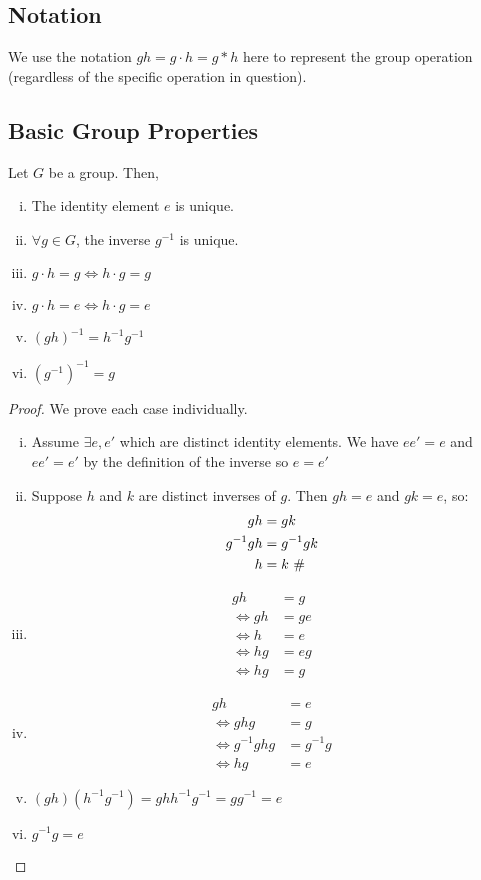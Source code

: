 \subsection{Notation}
We use the notation \(gh=g\cdot h = g \ast h\) here to represent the group operation (regardless of the specific operation in question).
\subsection{Basic Group Properties}
\begin{proposition}
	Let \(G\) be a group.
	Then,
	\begin{enumerate}[i.]
		\item The identity element \(e\) is unique.
		\item \(\forall g \in G\), the inverse \(g^{-1}\) is unique.
		\item \(g \cdot h = g \iff h \cdot g = g\)
		\item \(g \cdot h = e \iff h \cdot g = e\)
		\item \((gh)^{-1} = h^{-1} g^{-1}\)
		\item \((g^{-1})^{-1} = g\)
	\end{enumerate}
\end{proposition}
\begin{proof}
	We prove each case individually.
	\begin{enumerate}[i.]
		\item Assume \(\exists e, e'\) which are distinct identity elements.
		      We have \(e e' = e\) and \(e e' = e'\) by the definition of the inverse so \(e = e'\) \contradiction{}
		\item Suppose \(h\) and \(k\) are distinct inverses of \(g\).
		      Then \(gh = e\) and \(gk = e\), so:
		      \begin{align*}
			      gh        & = gk                       \\
			      g^{-1} gh & = g^{-1} gk                \\
			      h         & = k \text{ \(\#\)}
		      \end{align*}
		\item \begin{align*}
			      gh      & = g  \\
			      \iff gh & = ge \\
			      \iff h  & = e  \\
			      \iff hg & = eg \\
			      \iff hg & = g
		      \end{align*}
		\item \begin{align*}
			      gh              & = e       \\
			      \iff ghg        & = g       \\
			      \iff g^{-1} ghg & = g^{-1}g \\
			      \iff hg         & = e
		      \end{align*}
		\item \((gh) (h^{-1}g^{-1}) = g h h^{-1} g^{-1} = g g^{-1} = e\)
		\item \(g^{-1} g = e\)
	\end{enumerate}
\end{proof}

